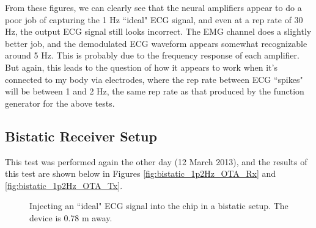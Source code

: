 \documentclass[12pt,onecolumn,titlepage]{article}
\begin{document}
From these figures, we can clearly see that the neural amplifiers appear to do a poor job of capturing the 1 Hz ``ideal" ECG signal, and even at a rep rate of 30 Hz, the output ECG signal still looks incorrect. The EMG channel does a slightly better job, and the demodulated ECG waveform appears somewhat recognizable around 5 Hz. This is probably due to the frequency response of each amplifier. But again, this leads to the question of how it appears to work when it's connected to my body via electrodes, where the rep rate between ECG ``spikes" will be between 1 and 2 Hz, the same rep rate as that produced by the function generator for the above tests.

\subsection{Bistatic Receiver Setup}
\indent \indent This test was performed again the other day (12 March 2013), and the results of this test are shown below in Figures \ref{fig:bistatic_1p2Hz_OTA_Rx} and \ref{fig:bistatic_1p2Hz_OTA_Tx}.



\begin{figure}[htbp]
	\centering
		\quad
	\label{fig:bistatic_ECG_OTA}
	\caption{Injecting an ``ideal" ECG signal into the chip in a bistatic setup. The device is 0.78 m away.}
\end{figure}
\end{document}
